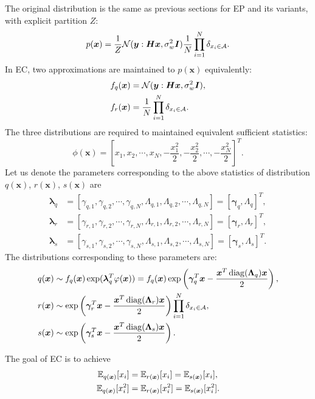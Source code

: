 \documentclass{article}
\DeclarePairedDelimiter{\diagfences}{(}{)}
\newcommand{\diag}{\operatorname{diag}\diagfences}
\begin{document}
The original distribution is the same as previous sections for EP and its variants, with explicit partition $Z$:
\begin{equation}
  p(\bm{x}) = \frac{1}{Z} \mathcal{N}(\bm{y}: \bm{H}\bm{x}, \sigma_{w}^2\bm{I}) \frac{1}{N}\prod_{i=1}^{N} \delta_{x_i \in \mathcal{A}}.
\end{equation}
In EC, two approximations are maintained to $p(\bm{x})$ equivalently:
\begin{align}
  f_q(\bm{x}) &= \mathcal{N}(\bm{y}: \bm{H}\bm{x}, \sigma^{2}_{w} \bm{I}), \\
  f_r(\bm{x}) &= \frac{1}{N} \prod_{i=1}^{N} \delta_{x_i \in \mathcal{A}}.
\end{align}
The three distributions are required to maintained equivalent sufficient statistics:
\begin{equation}
  \phi(\bm{x}) = \left[ x_1, x_2, \cdots, x_N, -\frac{x_1^2}{2}, -\frac{x_2^2}{2}, \cdots, -\frac{x_N^2}{2} \right]^{T}.
\end{equation}
Let us denote the parameters corresponding to the above statistics of distribution $q(\bm{x})$, $r(\bm{x})$, $s(\bm{x})$ are
\begin{align}
  \bm{\lambda}_q &= [\gamma_{q,1}, \gamma_{q,2}, \cdots, \gamma_{q,N}, \Lambda_{q,1}, \Lambda_{q,2}, \cdots, \Lambda_{q,N}] = [\bm{\gamma}_q, \Lambda_q]^{T}, \\
  \bm{\lambda}_r &= [\gamma_{r,1}, \gamma_{r,2}, \cdots, \gamma_{r,N}, \Lambda_{r,1}, \Lambda_{r,2}, \cdots, \Lambda_{r,N}] = [\bm{\gamma}_r, \Lambda_r]^{T}, \\
  \bm{\lambda}_s &= [\gamma_{s,1}, \gamma_{s,2}, \cdots, \gamma_{s,N}, \Lambda_{s,1}, \Lambda_{s,2}, \cdots, \Lambda_{s,N}] = [\bm{\gamma}_s, \Lambda_s]^{T}.
\end{align}
The distributions corresponding to these parameters are:
\begin{align}
  q(\bm{x}) &\sim f_q(\bm{x}) \exp(\bm{\lambda}_q^{T} \phi(\bm{x})) = f_q(\bm{x}) \exp\left( \bm{\gamma}_q^{T}\bm{x} - \frac{\bm{x}^{T}\diag{\bm{\Lambda}_q} \bm{x}}{2} \right), \\
  r(\bm{x}) &\sim \exp\left(  \bm{\gamma}_r^{T}\bm{x} - \frac{\bm{x}^{T}\diag{\bm{\Lambda}_r} \bm{x}}{2} \right) \prod_{i=1}^{N} \delta_{x_i\in\Aa}, \\
  s(\bm{x}) &\sim \exp\left(  \bm{\gamma}_s^{T}\bm{x} - \frac{\bm{x}^{T}\diag{\bm{\Lambda}_s} \bm{x}}{2} \right).
\end{align}


The goal of EC is to achieve
\begin{align}
  \mathbb{E}_{q(\bm{x})}[x_i] &= \mathbb{E}_{r(\bm{x})}[x_i] = \mathbb{E}_{s(\bm{x})}[x_i], \\
  \mathbb{E}_{q(\bm{x})}[x_i^2] &= \mathbb{E}_{r(\bm{x})}[x_i^2] = \mathbb{E}_{s(\bm{x})}[x_i^2].
\end{align}
\end{document}
